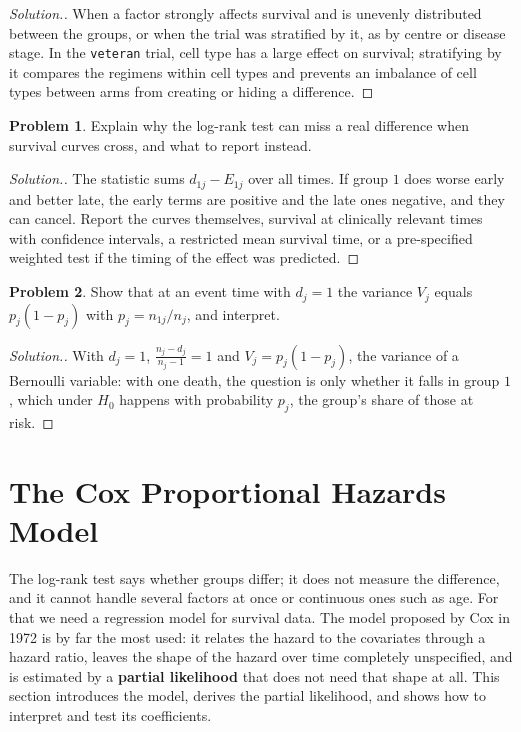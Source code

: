 \documentclass[11pt,a4paper]{article}
\numberwithin{equation}{section}
\theoremstyle{definition}
\newtheorem{problemx}{Problem}[subsection]
\newenvironment{problem}{\begin{problemx}}{\end{problemx}}
\newenvironment{solution}
  {\renewcommand{\qedsymbol}{}\begin{proof}[\textit{Solution}.]}
  {\end{proof}}
\begin{document}
\begin{solution}
When a factor strongly affects survival and is unevenly distributed between the groups, or when the trial was stratified by it, as by centre or disease stage. In the \texttt{veteran} trial, cell type has a large effect on survival; stratifying by it compares the regimens within cell types and prevents an imbalance of cell types between arms from creating or hiding a difference.
\end{solution}

\begin{problem}
Explain why the log-rank test can miss a real difference when survival curves cross, and what to report instead.
\end{problem}

\begin{solution}
The statistic sums $d_{1j} - E_{1j}$ over all times. If group $1$ does worse early and better late, the early terms are positive and the late ones negative, and they can cancel. Report the curves themselves, survival at clinically relevant times with confidence intervals, a restricted mean survival time, or a pre-specified weighted test if the timing of the effect was predicted.
\end{solution}

\begin{problem}
Show that at an event time with $d_j = 1$ the variance $V_j$ equals $p_j(1 - p_j)$ with $p_j = n_{1j}/n_j$, and interpret.
\end{problem}

\begin{solution}
With $d_j = 1$, $\frac{n_j - d_j}{n_j - 1} = 1$ and $V_j = p_j(1 - p_j)$, the variance of a Bernoulli variable: with one death, the question is only whether it falls in group $1$, which under $H_0$ happens with probability $p_j$, the group's share of those at risk.
\end{solution}

\section{The Cox Proportional Hazards Model}
\label{sec:cox}

The log-rank test says whether groups differ; it does not measure the difference, and it cannot handle several factors at once or continuous ones such as age. For that we need a regression model for survival data. The model proposed by Cox in 1972 is by far the most used: it relates the hazard to the covariates through a hazard ratio, leaves the shape of
the hazard over time completely unspecified, and is estimated by a \textbf{partial likelihood} that does not need that shape at all. This section introduces the model, derives the partial likelihood, and shows how to interpret and test its coefficients.
\end{document}
